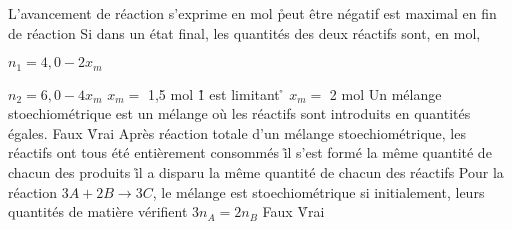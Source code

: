 \q
L'avancement de réaction
\rv
s'exprime en mol
\r
peut être négatif
\rv
est maximal en fin de réaction
\q
Si dans un état final, les quantités des deux réactifs sont, en mol, 

$n_1 = 4,0 - 2x_m$

$n_2 = 6,0 - 4x_m$
\rv
$x_m=$ 1,5 mol
\r
1 est limitant
\r
$x_m=$ 2 mol
\q
Un mélange stoechiométrique est un mélange o\`u les réactifs sont introduits en quantités égales.
\rv
Faux
\r
Vrai
\q
Après réaction totale d'un mélange stoechiométrique, 
\rv
les réactifs ont tous été entièrement consommés
\r
il s'est formé la même quantité de chacun des produits
\r
il a disparu la même quantité de chacun des réactifs
\q
Pour la réaction $3 A + 2 B \longrightarrow 3 C$, le mélange est stoechiométrique si initialement, leurs quantités de matière vérifient $3 n_A = 2 n_B$
\rv
Faux
\r
Vrai
